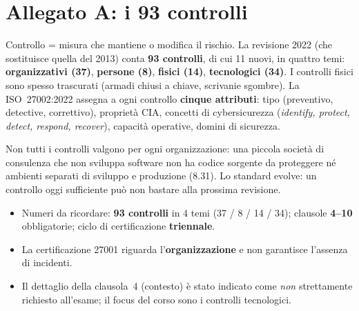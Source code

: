 \section{Allegato A: i 93 controlli}
Controllo = misura che mantiene o modifica il rischio. La revisione 2022 (che sostituisce quella del
2013) conta \textbf{93 controlli}, di cui 11 nuovi, in quattro temi:
\textbf{organizzativi (37)}, \textbf{persone (8)}, \textbf{fisici (14)}, \textbf{tecnologici (34)}.
I controlli fisici sono spesso trascurati (armadi chiusi a chiave, scrivanie sgombre). La ISO~27002:2022
assegna a ogni controllo \textbf{cinque attributi}: tipo (preventivo, detective, correttivo), proprietà
CIA, concetti di cybersicurezza (\emph{identify, protect, detect, respond, recover}), capacità operative,
domini di sicurezza.

Non tutti i controlli valgono per ogni organizzazione: una piccola società di consulenza che non sviluppa
software non ha codice sorgente da proteggere né ambienti separati di sviluppo e produzione (8.31). Lo
standard evolve: un controllo oggi sufficiente può non bastare alla prossima revisione.

\begin{esame}
\begin{itemize}
  \item Numeri da ricordare: \textbf{93 controlli} in 4 temi (37 / 8 / 14 / 34); clausole \textbf{4--10}
    obbligatorie; ciclo di certificazione \textbf{triennale}.
  \item La certificazione 27001 riguarda l'\textbf{organizzazione} e non garantisce l'assenza di
    incidenti.
  \item Il dettaglio della clausola~4 (contesto) è stato indicato come \emph{non} strettamente richiesto
    all'esame; il focus del corso sono i controlli tecnologici.
\end{itemize}
\end{esame}

